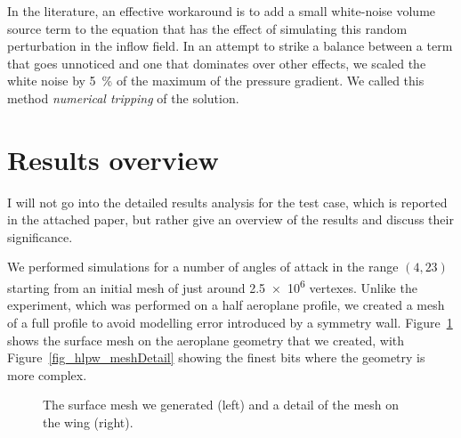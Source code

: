 In the literature, an effective workaround is to add a small white-noise volume source term to the equation that has the effect of simulating this random perturbation in the inflow field.
In an attempt to strike a balance between a term that goes unnoticed and one that dominates over other effects, we scaled the white noise by \SI{5}{\percent} of the maximum of the pressure gradient.
We called this method \emph{numerical tripping} of the solution.

\section{Results overview}
\label{sec_results}
I will not go into the detailed results analysis for the test case, which is reported in the attached paper, but rather give an overview of the results and discuss their significance.

We performed simulations for a number of angles of attack in the range \((4, 23)\) starting from an initial mesh of just around \num{2.5e6} vertexes.
Unlike the experiment, which was performed on a half aeroplane profile, we created a mesh of a full profile to avoid modelling error introduced by a symmetry wall.
Figure~\ref{fig_hlpw_mesh} shows the surface mesh on the aeroplane geometry that we created, with Figure~\ref{fig_hlpw_meshDetail} showing the finest bits where the geometry is more complex.
\begin{figure}
  \centering
  \quad
  \caption{The surface mesh we generated (left) and a detail of the mesh on the wing (right).}
  \label{fig_hlpw_mesh}
\end{figure}


